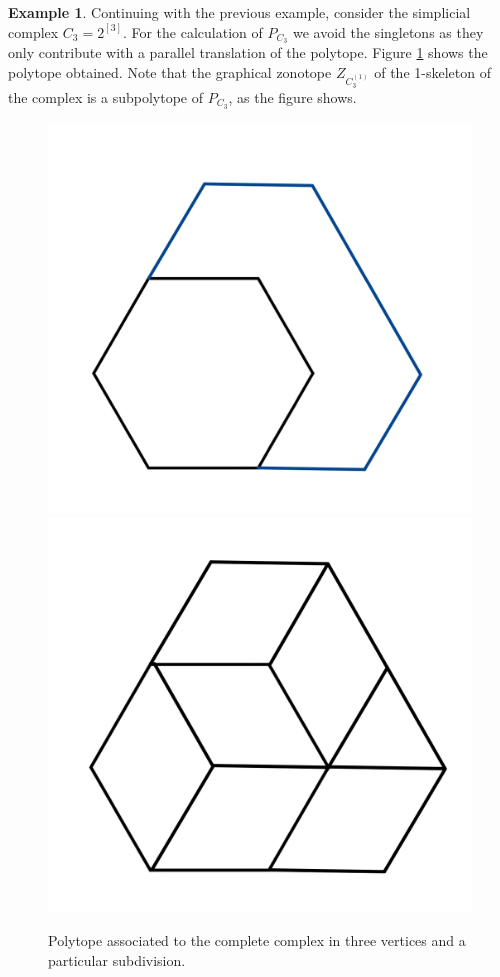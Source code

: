 \documentclass[english,11pt]{article}
\theoremstyle{definition}
\theoremstyle{definition}
\theoremstyle{definition}
\newtheorem{example}{Example}[section]
\theoremstyle{remark}
\theoremstyle{definition}
\begin{document}
\begin{example}
Continuing with the previous example, consider the simplicial complex $C_3 = 2^{[3]}$. For the calculation of $P_{C_3}$ we avoid the singletons as they only contribute with a parallel translation of the polytope. Figure \ref{fig:P_C_3} shows the polytope obtained. Note that the graphical zonotope $Z_{C_3^{(1)}}$ of the 1-skeleton of the complex is a subpolytope of $P_{C_3}$, as the figure shows. 

\begin{figure}
    \centering
    \includegraphics[scale=0.14]{images/P_C_3.png}
    \includegraphics[scale=0.14]{images/P_C_3-subdivision.png}
    \caption{Polytope associated to the complete complex in three vertices and a particular subdivision.}
    \label{fig:P_C_3}
\end{figure}
\end{example}
\end{document}
